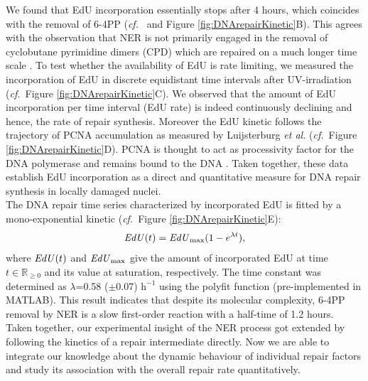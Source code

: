 We found that EdU incorporation essentially stops after 4 hours, which coincides with the removal of 6-4PP (\textit{cf.}\ \cite{Luijsterburg2010} and Figure \ref{fig:DNArepairKinetic}B). This agrees with the observation that NER is not primarily engaged in the removal of cyclobutane pyrimidine dimers (CPD) which are repaired on a much longer time scale \cite{Luijsterburg2010}. To test whether the availability of EdU is rate limiting, we measured the incorporation of EdU in discrete equidistant time intervals after UV-irradiation (\textit{cf.}\ Figure \ref{fig:DNArepairKinetic}C). We observed that the amount of EdU incorporation per time interval (EdU rate) is indeed continuously declining and hence, the rate of repair synthesis. Moreover the EdU kinetic follows the trajectory of PCNA accumulation as measured by Luijsterburg \textit{et al.} \cite{Luijsterburg2010} (\textit{cf.}\ Figure \ref{fig:DNArepairKinetic}D). PCNA is thought to act as processivity factor for the DNA polymerase and remains bound to the DNA \cite{Luijsterburg2010,Essers2005,Sporbert2002}. Taken together, these data establish EdU incorporation as a direct and quantitative measure for DNA repair synthesis in locally damaged nuclei.\\
The DNA repair time series characterized by incorporated EdU is fitted by a mono-exponential kinetic (\textit{cf.}\ Figure \ref{fig:DNArepairKinetic}E):
\begin{equation}
\text{\textit{EdU}}(t) = \text{\textit{EdU}}_\text{max}(1 - e^{\lambda t}),
\label{Eqn:EdU_kinetic}
\end{equation}  
where $\text{\textit{EdU}}(t)$ and $\text{\textit{EdU}}_{\text{max}}$ give the amount of incorporated EdU at time $t\in \mathds{R}_{\geq 0}$ and its value at saturation, respectively. The time constant was determined as $\lambda$=0.58 ($\pm$0.07) $\text{h}^{-\text{1}}$ using the polyfit function (pre-implemented in MATLAB). This result indicates that despite its molecular complexity, 6-4PP removal by NER is a slow first-order reaction with a half-time of 1.2 hours. \\
        

Taken together, our experimental insight of the NER process got extended by following the kinetics of a repair intermediate directly. Now we are able to integrate our knowledge about the dynamic behaviour of individual repair factors and study its association with the overall repair rate quantitatively.    